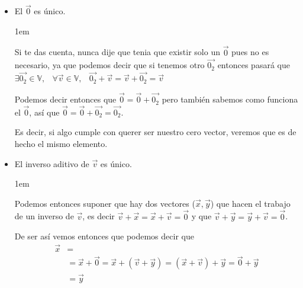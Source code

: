 \documentclass[12pt, fleqn]{report}                             %
\newenvironment{SmallIndentation}[1][0.75em]                    %
        {\begin{adjustwidth}{#1}{}\begin{footnotesize}}             %
        {\end{footnotesize}\end{adjustwidth}}                       %
\DeclareMathOperator \Space {\quad}                             %
\DeclareMathOperator \MiniSpace {\;}                            %
\theoremstyle{break}                                            %
\begin{document}
            \begin{itemize}
                \item El $\vec{0}$ es único.

                    \begin{SmallIndentation}[1em]
                        Si te das cuenta, nunca dije que tenia que existir solo un $\vec{0}$ pues no es
                        necesario, ya que podemos decir que si tenemos otro $\vec{0_2}$ entonces pasará que 
                        $\exists \vec{0_2} \in \mathbb{V}, \MiniSpace
                            \forall \vec{v} \in \mathbb{V}, \MiniSpace
                                \vec{0_2} + \vec{v} = \vec{v} + \vec{0_2} = \vec{v}$

                        Podemos decir entonces que $\vec{0} = \vec{0}+\vec{0_2}$ pero también sabemos como
                        funciona el $\vec{0}$, así que $\vec{0} = \vec{0}+\vec{0_2} = \vec{0_2}$.

                        Es decir, si algo cumple con querer ser nuestro cero vector, veremos que es de hecho
                        el mismo elemento.

                    \end{SmallIndentation}

                \item El inverso aditivo de $\vec{v}$ es único.

                    \begin{SmallIndentation}[1em]
                        Podemos entonces suponer que hay dos vectores ($\vec{x}, \vec{y}$) que hacen el 
                        trabajo de un inverso de $\vec{v}$, es decir
                        $\vec{v} + \vec{x} = \vec{x} + \vec{v} = \vec{0}$ y que 
                        $\vec{v} + \vec{y} = \vec{y} + \vec{v} = \vec{0}$.

                        De ser así vemos entonces que podemos decir que
                        \begin{equation*}
                        \begin{split}
                            \vec{x} &=                                  \\
                                    &= \vec{x} + \vec{0} 
                                     = \vec{x} + (\vec{v} + \vec{y}) 
                                     = (\vec{x} + \vec{v}) + \vec{y}
                                     = \vec{0} + \vec{y}                \\ 
                                    &= \vec{y}
                        \end{split}
                        \end{equation*}


\end{SmallIndentation}
\end{itemize}
\end{document}
